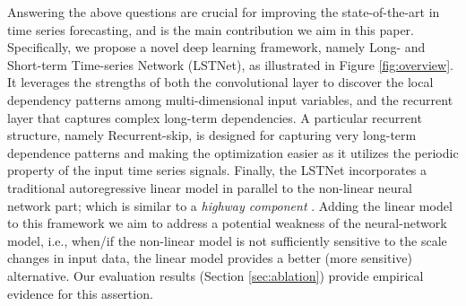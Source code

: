 
Answering the above questions are crucial for improving the state-of-the-art in time series forecasting, and is the main contribution we aim in this paper.  Specifically, we propose a novel deep learning framework, namely Long- and Short-term Time-series Network (LSTNet), as illustrated in Figure \ref{fig:overview}. It leverages the strengths of both the convolutional layer to discover the local dependency patterns among multi-dimensional input variables, and the recurrent layer that captures complex long-term dependencies. A particular recurrent structure, namely Recurrent-skip, is designed for capturing very long-term dependence patterns and making the optimization easier as it utilizes the periodic property of the input time series signals. Finally, the LSTNet incorporates a traditional autoregressive linear model in parallel to the non-linear neural network part; which is similar to a \textit{highway component} \cite{srivastava2015highway}. Adding the linear model to this framework we aim to address a potential weakness of the neural-network model, i.e., when/if the non-linear model is not sufficiently sensitive to the scale changes in input data, the linear model provides a better (more sensitive) alternative. Our evaluation results (Section \ref{sec:ablation}) provide empirical evidence for this assertion. 
     
